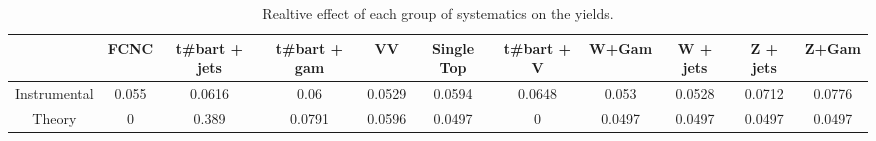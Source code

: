 \begin{table}[htbp]
\begin{center}
\begin{tabular}{|c|c|c|c|c|c|c|c|c|c|c|}
\hline 
      & FCNC      & t#bar{t} + jets      & t#bar{t} +  gam      & VV      & Single Top      & t#bar{t} + V      & W+Gam      & W + jets      & Z + jets      & Z+Gam \\ 
\hline 
 Instrumental & 0.055 & 0.0616 & 0.06 & 0.0529 & 0.0594 & 0.0648 & 0.053 & 0.0528 & 0.0712 & 0.0776 \\ 
 Theory & 0 & 0.389 & 0.0791 & 0.0596 & 0.0497 & 0 & 0.0497 & 0.0497 & 0.0497 & 0.0497 \\ 
\hline 
\end{tabular} 
\caption{Realtive effect of each group of systematics on the yields.} 
\end{center} 
\end{table} 
